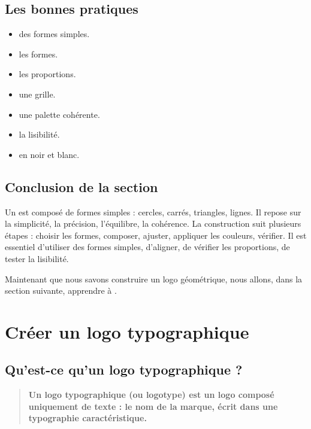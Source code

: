 \subsection{Les bonnes pratiques}

\begin{itemize}
    \item {} des formes simples.
    \item {} les formes.
    \item {} les proportions.
    \item {} une grille.
    \item {} une palette cohérente.
    \item {} la lisibilité.
    \item {} en noir et blanc.
\end{itemize}

\subsection*{Conclusion de la section}

Un  est composé de formes simples : cercles, carrés, triangles, lignes. Il repose sur la simplicité, la précision, l'équilibre, la cohérence. La construction suit plusieurs étapes : choisir les formes, composer, ajuster, appliquer les couleurs, vérifier. Il est essentiel d'utiliser des formes simples, d'aligner, de vérifier les proportions, de tester la lisibilité.

Maintenant que nous savons construire un logo géométrique, nous allons, dans la section suivante, apprendre à .

\section{Créer un logo typographique}

\subsection{Qu'est-ce qu'un logo typographique ?}

\begin{quote}
\textbf{Un logo typographique (ou logotype) est un logo composé uniquement de texte : le nom de la marque, écrit dans une typographie caractéristique.}
\end{quote}

